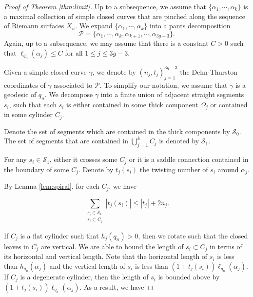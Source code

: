\documentclass{amsart}
\theoremstyle{plain}
\theoremstyle{definition}
\numberwithin{equation}{section}
\begin{document}
\begin{proof}[Proof of Theorem \ref{thm:limit}]
Up to a subsequence, we 
assume that $\{\alpha_1,\cdots,\alpha_k\}$ is a maximal collection of 
simple closed curves that are pinched along the sequence of Riemann surfaces $X_n$. 
We expand $\{\alpha_1,\cdots,\alpha_k\}$ into a pants decomposition $$\mathcal{P}=\{\alpha_1,\cdots,\alpha_k, \alpha_{k+1}, \cdots, \alpha_{3g-3}\}.$$
Again, up to a subsequence, we may assume that there is a constant $C>0$ such that 
$\ell_{q_n}(\alpha_j) \leq C$ for all $1\leq j \leq 3g-3$. 

Given a simple closed curve $\gamma$, we denote by $\left(n_j, t_j \right)_{j=1}^{3g-3}$
the Dehn-Thurston coordinates of $\gamma$ associated to $\mathcal{P}$. 
To simplify our notation, we assume that $\gamma$ is a geodesic of $q_n$. We decompose $\gamma$ into a finite union of adjacent straight segments $s_i$, 
such that each $s_i$ is either contained in some thick component $\Omega_j$ or contained in some cylinder $C_j$.


Denote the set of segments which are contained in 
the thick components by $\mathcal{S}_0$.  The set of segments that are contained in $\bigcup\limits_{j=1}^k C_j$ is denoted by $\mathcal{S}_1$. 



For any $s_i\in \mathcal{S}_1$, either it crosses some $C_j$ or it is a saddle connection contained in the boundary of some $C_j$. 
Denote by $t_j(s_i)$ the twisting number of $s_i$ around $\alpha_j$. 





By Lemma \ref{lem:spiral}, for each $C_j$, we have  

$$\sum_{\substack{s_i\in \mathcal{S}_1 \\
s_i\subset C_j}} |t_j(s_i)|\leq |t_j|+2n_j.$$

If  $C_j$ is a flat cylinder such that $h_j(q_n)>0$, then 
we rotate such that the closed leaves in $C_j$ are vertical.
We are able to bound the length of $s_i\subset C_j$
in terms of its horizontal and vertical length. 
Note that the horizontal length of $s_i$ is less than $h_{q_n}(\alpha_j)$ and the vertical length of $s_i$ is less than $\left( 1+t_j(s_i) \right) \ell_{q_n}(\alpha_j)$. 
If $C_j$ is a degenerate cylinder, then the length of $s_i$ is  bounded above by
$\left( 1+t_j(s_i) \right) \ell_{q_n}(\alpha_j)$.
As a result, we have 




\end{proof}
\end{document}
